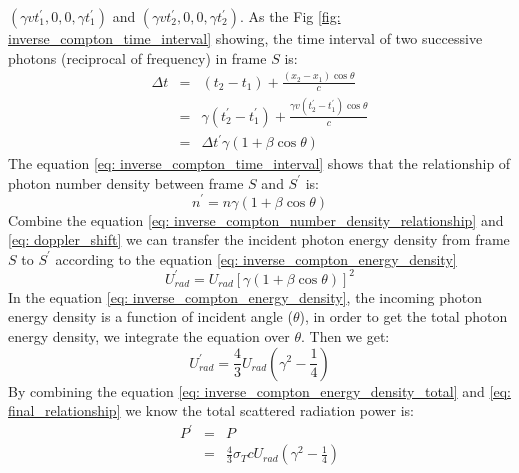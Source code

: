 \documentclass[12pt]{report}
\begin{document}
          $\left(\gamma v t_{1}^{\prime}, 0, 0, \gamma t_{1}^{\prime}\right)$ and 
          $\left(\gamma v t_{2}^{\prime}, 0, 0, \gamma t_{2}^{\prime}\right)$. 
          As the Fig \ref{fig: inverse_compton_time_interval} showing, the time interval of two successive 
          photons (reciprocal of frequency) in frame $S$ is: 
          \begin{eqnarray}
            \label{eq: inverse_compton_time_interval}
            \Delta t &=& \left(t_2 - t_1\right) + \frac{\left(x_2 - x_1\right) \cos{\theta}}{c}  \nonumber \\
                     &=& \gamma \left(t_{2}^{\prime} - t_{1}^{\prime}\right) + \frac{\gamma v \left(t_{2}^{\prime} - t_{1}^{\prime}\right) \cos{\theta}}{c} \nonumber \\
                     &=&  \Delta t^{\prime} \gamma \left(1 + \beta \cos{\theta}\right) 
          \end{eqnarray}
          The equation \ref{eq: inverse_compton_time_interval} shows that the relationship of photon number 
          density between frame $S$ and $S^{\prime}$ is:
          \begin{equation}
            \label{eq: inverse_compton_number_density_relationship}
            n^{\prime} = n \gamma \left(1 + \beta \cos{\theta}\right) 
          \end{equation}
          Combine the equation \ref{eq: inverse_compton_number_density_relationship} and 
          \ref{eq: doppler_shift} we can transfer the incident photon energy density from frame $S$ to 
          $S^{\prime}$ according to the equation \ref{eq: inverse_compton_energy_density}
          \begin{equation}
            \label{eq: inverse_compton_energy_density}
            U_{rad}^{\prime} = U_{rad} \left[\gamma \left(1 + \beta \cos{\theta}\right)\right]^{2}
          \end{equation}
          In the equation \ref{eq: inverse_compton_energy_density}, the incoming photon energy density 
          is a function of incident angle ($\theta$), in order to get the total photon energy density,
          we integrate the equation over $\theta$. Then we get: 
          \begin{equation}
            \label{eq: inverse_compton_energy_density_total}
            U_{rad}^{\prime} = \frac{4}{3} U_{rad} \left(\gamma^2 - \frac{1}{4}\right)
          \end{equation}
          By combining the equation \ref{eq: inverse_compton_energy_density_total} and 
          \ref{eq: final_relationship} we know the total scattered radiation power is:
          \begin{eqnarray}
            \label{eq: inverse_compton_power}
            P^{\prime} &=& P  \nonumber \\
                      &=& \frac{4}{3} \sigma_{T} c U_{rad} \left(\gamma^2 - \frac{1}{4}\right)
          \end{eqnarray}
          
\end{document}

